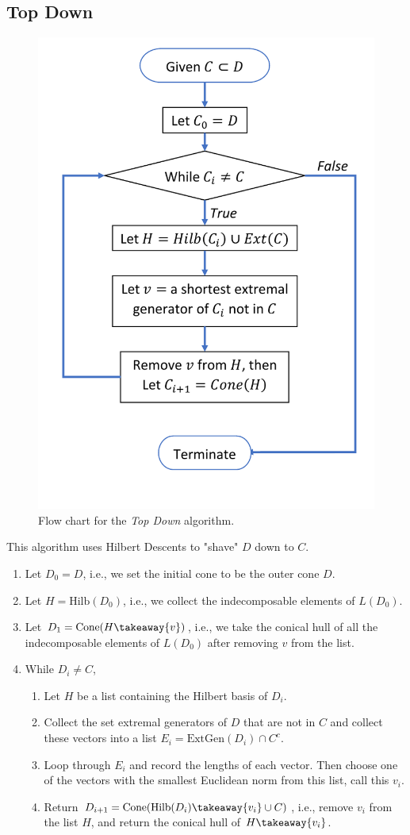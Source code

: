 \documentclass{TC}
\begin{document}
\subsection{Top Down}
\begin{figure}[h]
\centering
\includegraphics[width=.49\textwidth]{TopDownFC.pdf}
\caption{Flow chart for the \emph{Top Down} algorithm.}
\end{figure}
This algorithm uses Hilbert Descents to "shave" $D$ down to $C$.


\begin{enumerate}
\item Let $D_0 = D$, i.e., we set the initial cone to be the outer cone $D$.
\item Let $H = \mathrm{Hilb}(D_0)$, i.e., we collect the indecomposable elements of $L(D_0)$.
\item Let $D_1 = \mathrm{Cone}(H \takeaway \{v\})$, i.e., we take the conical hull of all the indecomposable elements of $L(D_0)$ after removing $v$ from the list.


\item While $D_i \neq C$, 
	\begin{enumerate}
	
		\item Let $H$ be a list containing the Hilbert basis of $D_{i}$. 
		\item Collect the set extremal generators of $D$ that are not in $C$ and collect these vectors into a list $E_{i} = \mathrm{ExtGen}(D_i) \cap C^c$.
		\item Loop through $E_{i}$ and record the lengths of each vector. Then choose one of the vectors with the smallest Euclidean norm from this list, call this $v_i$.
		\item Return $D_{i+1} = \mathrm{Cone}(\mathrm{Hilb}(D_i)\takeaway\{v_i\} \cup C)$, i.e., remove $v_i$ from the list $H$, and return the conical hull of $H \takeaway \{v_i\}$.
		
	\end{enumerate} 
\end{enumerate}
\end{document}
